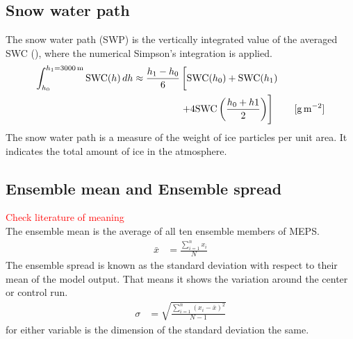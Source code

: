 \subsection{Snow water path}
The snow water path (SWP) is the vertically integrated value of the averaged SWC (), where the numerical Simpson's integration is applied.  
\begin{equation}
	\begin{split}
		\int_{h_0}^{h_1=\SI{3000}{\metre}} \text{SWC}(h) \, dh \approx 
		\frac{h_1 - h_0}{6}  & \left[ \text{SWC}(h_0)    + \text{SWC}(h_1)   \vphantom{\frac{h_0 + h1}{2}} \right. \\ 
		& \left. + 4 \text{SWC}\left(\frac{h_0 + h1}{2}\right)  
		\right] \qquad [\SI{}{\g\per\square\meter}]
	\end{split}
	\label{eq:SWP}
\end{equation}
The snow water path is a measure of the weight of ice particles per unit area. It indicates the total amount of ice in the atmosphere.
\subsection{Ensemble mean and Ensemble spread}
\textcolor{red}{Check literature of meaning} \\
The ensemble mean is the average of all ten ensemble members of MEPS.
\begin{align}
	\bar{x} & = \frac{\sum_{i=1}^n x_i}{N}
\end{align}
The ensemble spread is known as the standard deviation with respect to their mean of the model output. That means it shows the variation around the center or control run.
\begin{align}
	\sigma & = \sqrt{\frac{\sum_{i=1}^n (x_i - \bar{x})^2}{N-1}}
\end{align}
for either variable is the dimension of the standard deviation the same.


